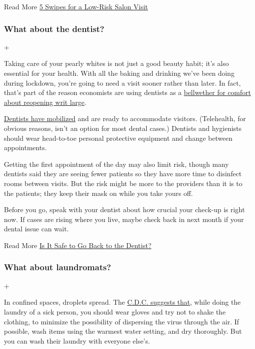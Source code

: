  Read More
\href{https://www.nytimes.com/interactive/2020/06/17/burst/5-swipes-for-a-low-risk-salon-visit.html}{5
Swipes for a Low-Risk Salon Visit}

\hypertarget{what-about-the-dentist}{%
\subsubsection{What about the dentist?}\label{what-about-the-dentist}}

+

Taking care of your pearly whites is not just a good beauty habit; it's
also essential for your health. With all the baking and drinking we've
been doing during lockdown, you're going to need a visit sooner rather
than later. In fact, that's part of the reason economists are using
dentists as a
\href{https://www.nytimes.com/2020/06/10/upshot/dentists-coronavirus-economic-indicator.html}{bellwether
for comfort about reopening writ large}.

\href{https://www.nytimes.com/2020/06/08/well/live/dental-care-dentistry-teeth-coronavirus.html}{Dentists
have mobilized} and are ready to accommodate visitors. (Telehealth, for
obvious reasons, isn't an option for most dental cases.) Dentists and
hygienists should wear head-to-toe personal protective equipment and
change between appointments.

Getting the first appointment of the day may also limit risk, though
many dentists said they are seeing fewer patients so they have more time
to disinfect rooms between visits. But the risk might be more to the
providers than it is to the patients; they keep their mask on while you
take yours off.

Before you go, speak with your dentist about how crucial your check-up
is right now. If cases are rising where you live, maybe check back in
next month if your dental issue can wait.

 Read More
\href{https://www.nytimes.com/2020/06/25/health/dentist-coronavirus-safe.html}{Is
It Safe to Go Back to the Dentist?}

\hypertarget{what-about-laundromats}{%
\subsubsection{What about laundromats?}\label{what-about-laundromats}}

+

In confined spaces, droplets spread. The
\href{https://www.cdc.gov/coronavirus/2019-ncov/prevent-getting-sick/cleaning-disinfection.html}{C.D.C.
suggests that}, while doing the laundry of a sick person, you should
wear gloves and try not to shake the clothing, to minimize the
possibility of dispersing the virus through the air. If possible, wash
items using the warmest water setting, and dry thoroughly. But you can
wash their laundry with everyone else's.

